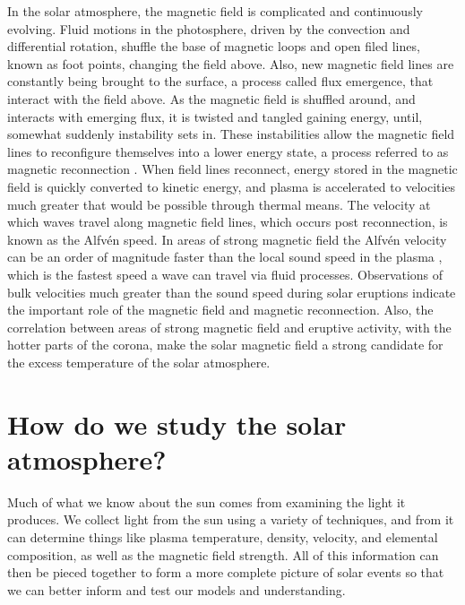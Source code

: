 In the solar atmosphere, the magnetic field is complicated and continuously evolving.
Fluid motions in the photosphere, driven by the convection and differential rotation, shuffle the base of magnetic loops and open filed lines, known as foot points, changing the field above.
Also, new magnetic field lines are constantly being brought to the surface, a process called flux emergence, that interact with the field above.
As the magnetic field is shuffled around, and interacts with emerging flux, it is twisted and tangled gaining energy, until, somewhat suddenly instability sets in.
These instabilities allow the magnetic field lines to reconfigure themselves into a lower energy state, a process referred to as magnetic reconnection \citep{Parker1957,Petschek1964}.
When field lines reconnect, energy stored in the magnetic field is quickly converted to kinetic energy, and plasma is accelerated to velocities much greater that would be possible through thermal means.
The velocity at which waves travel along magnetic field lines, which occurs post reconnection, is known as the Alfv\'en speed. 
In areas of strong magnetic field the Alfv\'en velocity can be an order of magnitude faster than the local sound speed in the plasma \citep{Priest2014}, which is the fastest speed a wave can travel via fluid processes.
Observations of bulk velocities much greater than the sound speed during solar eruptions indicate the important role of the magnetic field and magnetic reconnection.
Also, the correlation between areas of strong magnetic field and eruptive activity, with the hotter parts of the corona, make the solar magnetic field a strong candidate for the excess temperature of the solar atmosphere.

\section{How do we study the solar atmosphere?}
Much of what we know about the sun comes from examining the light it produces.
We collect light from the sun using a variety of techniques, and from it can determine things like plasma temperature, density, velocity, and elemental composition, as well as the magnetic field strength.
All of this information can then be pieced together to form a more complete picture of solar events so that we can better inform and test our models and understanding.


